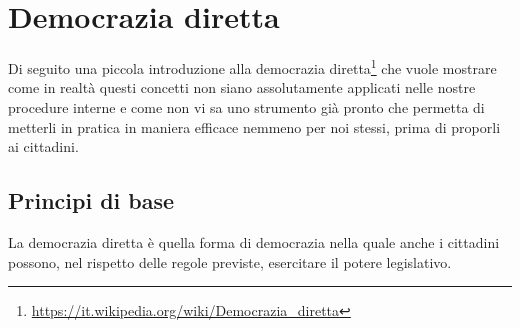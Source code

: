 \documentclass[10pt,a4paper]{book}
\begin{document}
\section{Democrazia diretta}
Di seguito una piccola introduzione alla democrazia diretta\footnote{\url{https://it.wikipedia.org/wiki/Democrazia_diretta}} che vuole mostrare come in realtà questi concetti non siano assolutamente applicati nelle nostre procedure interne e come non vi sa uno strumento già pronto che permetta di metterli in pratica in maniera efficace nemmeno per noi stessi, prima di proporli ai cittadini.
\subsection{Principi di base}
La democrazia diretta è quella forma di democrazia nella quale anche i cittadini possono, nel rispetto delle regole previste, esercitare il potere legislativo.
\end{document}
